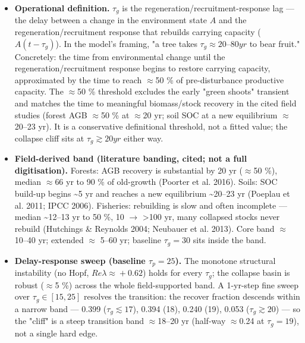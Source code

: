 \documentclass[11pt]{article}
\begin{document}
\begin{itemize}
\item \textbf{Operational definition.} $\tau{}_{g}$ is the regeneration/recruitment-response lag — the delay between a change in the environment state $A$ and the regeneration/recruitment response that rebuilds carrying capacity ($A(t - \tau{}_{g})$). In the model's framing, "a tree takes $\tau{}_{g} \approx{} 20–80 yr$ to bear fruit." Concretely: the time from environmental change until the regeneration/recruitment response begins to restore carrying capacity, approximated by the time to reach \ensuremath{\approx{}}50 \% of pre-disturbance productive capacity. The \ensuremath{\approx{}}50 \% threshold excludes the early "green shoots" transient and matches the time to meaningful biomass/stock recovery in the cited field studies (forest AGB \ensuremath{\approx{}}50 \% at \ensuremath{\approx{}}20 yr; soil SOC at a new equilibrium \ensuremath{\approx{}}20–23 yr). It is a conservative definitional threshold, not a fitted value; the collapse cliff sits at $\tau{}_{g} \gtrsim{} 20 yr$ either way.
\item \textbf{Field-derived band (literature banding, cited; not a full digitisation).} Forests: AGB recovery is substantial by 20 yr (\ensuremath{\approx{}}50 \%), median \ensuremath{\approx{}}66 yr to 90 \% of old-growth (Poorter et al. 2016). Soils: SOC build-up begins \~{}5 yr and reaches a new equilibrium \~{}20–23 yr (Poeplau et al. 2011; IPCC 2006). Fisheries: rebuilding is slow and often incomplete — median \~{}12–13 yr to 50 \%, 10 \ensuremath{\to{}} >100 yr, many collapsed stocks never rebuild (Hutchings \& Reynolds 2004; Neubauer et al. 2013). Core band \ensuremath{\approx{}} 10–40 yr; extended \ensuremath{\approx{}} 5–60 yr; baseline $\tau{}_{g} = 30$ sits inside the band.
\item \textbf{Delay-response sweep (baseline $\tau{}_{p}=25$).} The monotone structural instability (no Hopf, $Re \lambda{} \approx{} +0.62$) holds for every $\tau{}_{g}$; the collapse basin is robust (\ensuremath{\approx{}}5 \%) across the whole field-supported band. A 1-yr-step fine sweep over $\tau{}_{g} \in{} [15,25]$ resolves the transition: the recover fraction descends within a narrow band — 0.399 ($\tau{}_{g} \lesssim{} 17$), 0.394 (18), 0.240 (19), 0.053 ($\tau{}_{g} \gtrsim{} 20$) — so the "cliff" is a steep transition band \ensuremath{\approx{}}18–20 yr (half-way \ensuremath{\approx{}}0.24 at $\tau{}_{g} = 19$), not a single hard edge.
\end{itemize}
\end{document}

